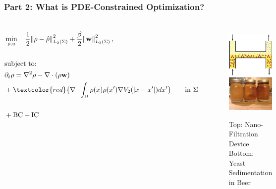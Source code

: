 \documentclass[aspectratio=169,xcolor=dvipsnames]{beamer}
\begin{document}
\begin{frame}
	\frametitle{Part 2: What is PDE-Constrained Optimization? }
	\begin{columns}


		\begin{align*}
		&\min_{\rho,u} \quad \frac{1}{2}\norm{\rho- \hat{\rho}}_{L_2(\Sigma)}^2 + \frac{\beta}{2} \norm{\mathbf{w}}_{L_2(\Sigma)}^2,\\
		\\
		&\text{subject to:}
		\\
		& \partial_t \rho = \nabla^2 \rho - \nabla \cdot (\rho \mathbf{w})\\
		&+\textcolor{red}{\nabla \cdot \int_\Omega \rho(x) \rho(x') \nabla V_2(|x-x'|)dx'} \qquad \text{in    } \Sigma\\
		\\
		&+ \text{BC} + \text{IC}
		\end{align*}
	   \begin{figure}
	    \includegraphics[width=3.5cm]{Microfilter.png}\\
		 \includegraphics[width=3.5cm]{beer.jpg}
		 \caption{Top: Nano-Filtration Device \\ Bottom: Yeast Sedimentation in Beer}
		\end{figure}
	
	\end{columns}
\end{frame}
\end{document}
